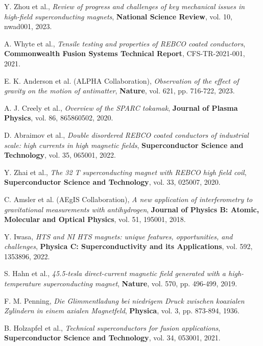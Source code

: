 \documentclass[12pt,a4paper]{article}
\begin{document}

\begin{thebibliography}{15}

Y. Zhou et al.,
\emph{Review of progress and challenges of key mechanical issues in high-field superconducting magnets},
\textbf{National Science Review}, vol. 10, nwad001, 2023.

A. Whyte et al.,
\emph{Tensile testing and properties of REBCO coated conductors},
\textbf{Commonwealth Fusion Systems Technical Report}, CFS-TR-2021-001, 2021.

E. K. Anderson et al. (ALPHA Collaboration),
\emph{Observation of the effect of gravity on the motion of antimatter},
\textbf{Nature}, vol. 621, pp. 716-722, 2023.

A. J. Creely et al.,
\emph{Overview of the SPARC tokamak},
\textbf{Journal of Plasma Physics}, vol. 86, 865860502, 2020.

D. Abraimov et al.,
\emph{Double disordered REBCO coated conductors of industrial scale: high currents in high magnetic fields},
\textbf{Superconductor Science and Technology}, vol. 35, 065001, 2022.

Y. Zhai et al.,
\emph{The 32 T superconducting magnet with REBCO high field coil},
\textbf{Superconductor Science and Technology}, vol. 33, 025007, 2020.

C. Amsler et al. (AEgIS Collaboration),
\emph{A new application of interferometry to gravitational measurements with antihydrogen},
\textbf{Journal of Physics B: Atomic, Molecular and Optical Physics}, vol. 51, 195001, 2018.

Y. Iwasa,
\emph{HTS and NI HTS magnets: unique features, opportunities, and challenges},
\textbf{Physica C: Superconductivity and its Applications}, vol. 592, 1353896, 2022.

S. Hahn et al.,
\emph{45.5-tesla direct-current magnetic field generated with a high-temperature superconducting magnet},
\textbf{Nature}, vol. 570, pp. 496-499, 2019.

F. M. Penning,
\emph{Die Glimmentladung bei niedrigem Druck zwischen koaxialen Zylindern in einem axialen Magnetfeld},
\textbf{Physica}, vol. 3, pp. 873-894, 1936.

B. Holzapfel et al.,
\emph{Technical superconductors for fusion applications},
\textbf{Superconductor Science and Technology}, vol. 34, 053001, 2021.


\end{thebibliography}
\end{document}
